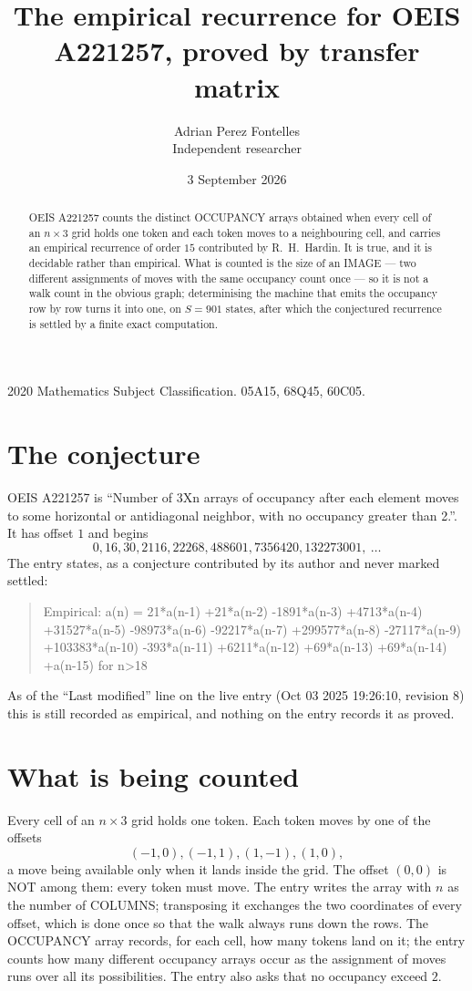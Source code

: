 \documentclass[11pt,a4paper]{article}
\title{The empirical recurrence for OEIS A221257, proved by transfer matrix}
\author{Adrian Perez Fontelles\\ \small Independent researcher}
\date{3 September 2026}
\theoremstyle{plain}
\theoremstyle{definition}
\begin{document}
\maketitle

\begin{abstract}
OEIS A221257 counts the distinct OCCUPANCY arrays obtained when every cell of an $n\times3$ grid
holds one token and each token moves to a neighbouring cell, and carries an empirical
recurrence of order $15$ contributed by R.~H.~Hardin. It is true, and it is decidable
rather than empirical. What is counted is the size of an IMAGE --- two different assignments of
moves with the same occupancy count once --- so it is not a walk count in the obvious graph;
determinising the machine that emits the occupancy row by row turns it into one, on $S=901$
states, after which the conjectured recurrence is settled by a finite exact computation.
\end{abstract}

\noindent\small 2020 Mathematics Subject Classification. 05A15, 68Q45, 60C05.\normalsize

\section{The conjecture}

OEIS A221257 is ``Number of 3Xn arrays of occupancy after each element moves to some horizontal or antidiagonal neighbor, with no occupancy greater than 2.''. It has offset $1$ and begins
\[
0, 16, 30, 2116, 22268, 488601, 7356420, 132273001,\ \dots
\]
The entry states, as a conjecture contributed by its author and never marked settled:
\begin{quote}
Empirical: a(n) = 21*a(n-1) +21*a(n-2) -1891*a(n-3) +4713*a(n-4) +31527*a(n-5) -98973*a(n-6) -92217*a(n-7) +299577*a(n-8) -27117*a(n-9) +103383*a(n-10) -393*a(n-11) +6211*a(n-12) +69*a(n-13) +69*a(n-14) +a(n-15) for n>18
\end{quote}
As of the ``Last modified'' line on the live entry (Oct 03 2025 19:26:10, revision 8) this is still
recorded as empirical, and nothing on the entry records it as proved.

\section{What is being counted}

Every cell of an $n\times3$ grid holds one token. Each token moves by one of the offsets
\[
(-1,0), (-1,1), (1,-1), (1,0),
\]
a move being available only when it lands inside the grid. The offset $(0,0)$ is NOT among them: every token must move. The entry writes the array with $n$ as the number of COLUMNS; transposing it exchanges the two coordinates of every offset, which is done once so that the walk always runs down the rows. The OCCUPANCY array
records, for each cell, how many tokens land on it; the entry counts how many different
occupancy arrays occur as the assignment of moves runs over all its possibilities. The entry also asks that no occupancy exceed $2$.
\end{document}
